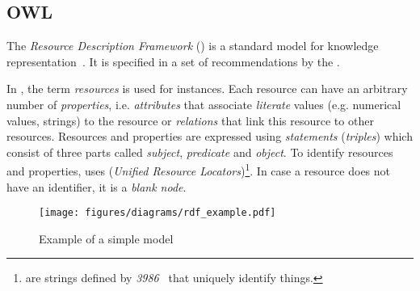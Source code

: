 \subsection{OWL}
\label{subsec:owl}

The \emph{Resource Description Framework} () is a standard model for knowledge representation~\cite{RDF}. It is specified in a set of recommendations by the .

In , the term \emph{resources} is used for instances. Each resource can have an arbitrary number of \emph{properties}, i.e. \emph{attributes} that associate \emph{literate} values (e.g. numerical values, strings) to the resource or \emph{relations} that link this resource to other resources. Resources and properties are expressed using \emph{statements} (\emph{triples}) which consist of three parts called \emph{subject}, \emph{predicate} and \emph{object}. To identify resources and properties,  uses  (\emph{Unified Resource Locators})\footnote{ are strings defined by \emph{ 3986}~\cite{rfc3986} that uniquely identify things.}. In case a resource does not have an identifier, it is a \emph{blank node}.

\begin{figure}
\centering
\texttt{[image: figures/diagrams/rdf\_example.pdf]}
\caption{Example of a simple  model}
\label{fig:rdf_example}
\end{figure}

